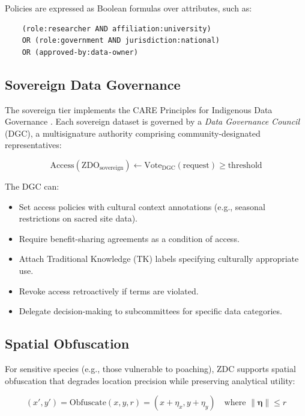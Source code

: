\documentclass[11pt,a4paper]{article}
\begin{document}
Policies are expressed as Boolean formulas over attributes, such as:

\begin{verbatim}
    (role:researcher AND affiliation:university)
    OR (role:government AND jurisdiction:national)
    OR (approved-by:data-owner)
\end{verbatim}

\subsection{Sovereign Data Governance}

The sovereign tier implements the CARE Principles for Indigenous Data Governance \citep{carroll2020care}.
Each sovereign dataset is governed by a \emph{Data Governance Council} (DGC), a multisignature authority comprising community-designated representatives:

\begin{equation}
    \text{Access}(\text{ZDO}_{\text{sovereign}}) \leftarrow \text{Vote}_{\text{DGC}}(\text{request}) \geq \text{threshold}
\end{equation}

The DGC can:
\begin{itemize}[leftmargin=*]
    \item Set access policies with cultural context annotations (e.g., seasonal restrictions on sacred site data).
    \item Require benefit-sharing agreements as a condition of access.
    \item Attach Traditional Knowledge (TK) labels specifying culturally appropriate use.
    \item Revoke access retroactively if terms are violated.
    \item Delegate decision-making to subcommittees for specific data categories.
\end{itemize}

\subsection{Spatial Obfuscation}

For sensitive species (e.g., those vulnerable to poaching), ZDC supports spatial obfuscation that degrades location precision while preserving analytical utility:

\begin{equation}
    (x', y') = \text{Obfuscate}(x, y, r) = (x + \eta_x, y + \eta_y) \quad \text{where } \|\boldsymbol{\eta}\| \leq r
\end{equation}
\end{document}
